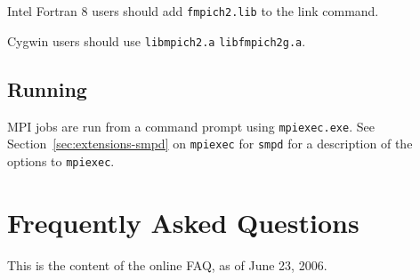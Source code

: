 \documentclass[dvipdfm,11pt]{article}
\begin{document}
Intel Fortran 8 users should add \texttt{fmpich2.lib} to the link command. 

Cygwin users should use \texttt{libmpich2.a} \texttt{libfmpich2g.a}.

\subsection{Running}
\label{sec:winrun}

MPI jobs are run from a command prompt using \texttt{mpiexec.exe}.  See
Section~\ref{sec:extensions-smpd} on \texttt{mpiexec} for \texttt{smpd}
for a description of the options to \texttt{mpiexec}.

\clearpage
\appendix

\section{Frequently Asked Questions}
This is the content of the online FAQ, as of June 23, 2006.





\end{document}
